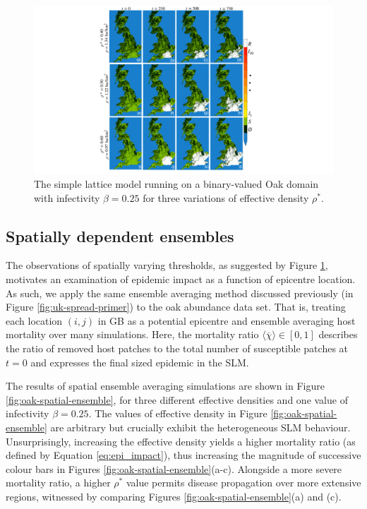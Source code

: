 \begin{figure}
    \centering
    \includegraphics[scale=0.490]{chapter4/figures/figure4.pdf}
    \caption{The simple lattice model running on a binary-valued Oak domain with infectivity $\beta=0.25$ for three variations of effective density $\rho^*$.}
    \label{fig:ch4_uk_spread}
\end{figure}

\subsection{Spatially dependent ensembles}
\label{sec:slm-spatial-ensembles}

The observations of spatially varying thresholds, as suggested by Figure \ref{fig:ch4_uk_spread}, 
motivates an examination of epidemic impact as a function of epicentre location.
As such, we apply the same ensemble averaging method discussed previously (in Figure \ref{fig:uk-spread-primer})
to the oak abundance data set. That is, treating each location $(i,j)$ in GB as a potential
epicentre and ensemble averaging host mortality over many simulations.
Here, the mortality ratio $\big\langle \overline{\chi} \big\rangle \in [0, 1]$ describes the ratio 
of removed host patches to the total number of susceptible patches at $t=0$ and 
expresses the final sized epidemic in the SLM. 

The results of spatial ensemble averaging simulations are shown in Figure \ref{fig:oak-spatial-ensemble},
for three different effective densities and one value of infectivity $\beta=0.25$. 
The values of effective density in Figure \ref{fig:oak-spatial-ensemble} are arbitrary
but crucially exhibit the heterogeneous SLM behaviour. Unsurprisingly, increasing the effective density yields a 
higher mortality ratio (as defined by Equation \ref{eq:epi_impact}), thus increasing the magnitude of successive 
colour bars in Figures \ref{fig:oak-spatial-ensemble}(a-c). Alongside a more severe mortality ratio, a higher $\rho^*$
value permits disease propagation over more extensive regions, witnessed by comparing Figures \ref{fig:oak-spatial-ensemble}(a) and (c).

